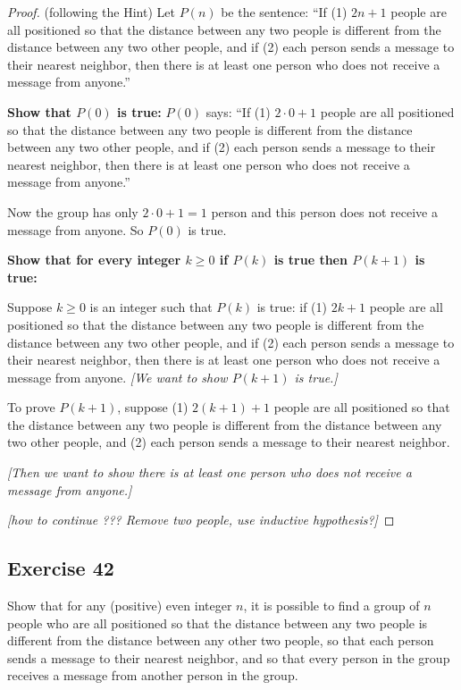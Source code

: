 \documentclass[14pt]{extarticle}
\begin{document}
\begin{proof}
    (following the Hint) Let $P(n)$ be the sentence: ``If (1) $2n + 1$ people are all positioned so that the distance between any two people is different from the distance between any two other people, and if (2) each person sends a message to their nearest neighbor, then there is at least one person who does not receive a message from anyone.''

    {\bf Show that $P(0)$ is true:} $P(0)$ says: ``If (1) $2 \cdot 0 + 1$ people are all positioned so that the distance between any two people is different from the distance between any two other people, and if (2) each person sends a message to their nearest neighbor, then there is at least one person who does not receive a message from anyone.''

    Now the group has only $2 \cdot 0 + 1 = 1$ person and this person does not receive a message from anyone. So $P(0)$ is true.

        {\bf Show that for every integer $k \geq 0$ if $P(k)$ is true then $P(k+1)$ is true:}

    Suppose $k\geq 0$ is an integer such that $P(k)$ is true: if (1) $2k + 1$ people are all positioned so that the distance between any two people is different from the distance between any two other people, and if (2) each person sends a message to their nearest neighbor, then there is at least one person who does not receive a message from anyone. {\it [We want to show $P(k+1)$ is true.]}

    To prove $P(k+1)$, suppose (1) $2(k+1) + 1$ people are all positioned so that the distance between any two people is different from the distance between any two other people, and (2) each person sends a message to their nearest neighbor.

        {\it [Then we want to show there is at least one person who does not receive a message from anyone.]}

        {\it [how to continue ??? Remove two people, use inductive hypothesis?]}
\end{proof}

\subsection{Exercise 42}
Show that for any (positive) even integer $n$, it is possible to find a group of $n$ people who are all positioned so that the distance between any two people is different from the distance between any other two people, so that each person sends a message to their nearest neighbor, and so that every person in the group receives a message from another person in the group.
\end{document}
